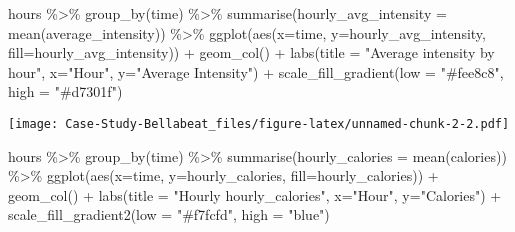 \documentclass[
]{article}
\newenvironment{Shaded}{\begin{snugshade}}{\end{snugshade}}
\newcommand{\AttributeTok}[1]{\textcolor[rgb]{0.77,0.63,0.00}{#1}}
\newcommand{\FunctionTok}[1]{\textcolor[rgb]{0.00,0.00,0.00}{#1}}
\newcommand{\NormalTok}[1]{#1}
\newcommand{\SpecialCharTok}[1]{\textcolor[rgb]{0.00,0.00,0.00}{#1}}
\newcommand{\StringTok}[1]{\textcolor[rgb]{0.31,0.60,0.02}{#1}}
\begin{document}
\begin{Shaded}
\begin{Highlighting}[]
\NormalTok{hours }\SpecialCharTok{\%\textgreater{}\%}
  \FunctionTok{group\_by}\NormalTok{(time) }\SpecialCharTok{\%\textgreater{}\%}
  \FunctionTok{summarise}\NormalTok{(}\AttributeTok{hourly\_avg\_intensity =} \FunctionTok{mean}\NormalTok{(average\_intensity))  }\SpecialCharTok{\%\textgreater{}\%}
  \FunctionTok{ggplot}\NormalTok{(}\FunctionTok{aes}\NormalTok{(}\AttributeTok{x=}\NormalTok{time, }\AttributeTok{y=}\NormalTok{hourly\_avg\_intensity, }\AttributeTok{fill=}\NormalTok{hourly\_avg\_intensity)) }\SpecialCharTok{+} 
  \FunctionTok{geom\_col}\NormalTok{() }\SpecialCharTok{+}
  \FunctionTok{labs}\NormalTok{(}\AttributeTok{title =} \StringTok{"Average intensity by hour"}\NormalTok{, }\AttributeTok{x=}\StringTok{"Hour"}\NormalTok{, }\AttributeTok{y=}\StringTok{"Average Intensity"}\NormalTok{) }\SpecialCharTok{+} 
  \FunctionTok{scale\_fill\_gradient}\NormalTok{(}\AttributeTok{low =} \StringTok{"\#fee8c8"}\NormalTok{, }\AttributeTok{high =} \StringTok{"\#d7301f"}\NormalTok{)}
\end{Highlighting}
\end{Shaded}

\texttt{[image: Case-Study-Bellabeat\_files/figure-latex/unnamed-chunk-2-2.pdf]}

\begin{Shaded}
\begin{Highlighting}[]
\NormalTok{hours }\SpecialCharTok{\%\textgreater{}\%}
  \FunctionTok{group\_by}\NormalTok{(time) }\SpecialCharTok{\%\textgreater{}\%}
  \FunctionTok{summarise}\NormalTok{(}\AttributeTok{hourly\_calories =} \FunctionTok{mean}\NormalTok{(calories)) }\SpecialCharTok{\%\textgreater{}\%}
  \FunctionTok{ggplot}\NormalTok{(}\FunctionTok{aes}\NormalTok{(}\AttributeTok{x=}\NormalTok{time, }\AttributeTok{y=}\NormalTok{hourly\_calories, }\AttributeTok{fill=}\NormalTok{hourly\_calories)) }\SpecialCharTok{+} 
  \FunctionTok{geom\_col}\NormalTok{() }\SpecialCharTok{+}
  \FunctionTok{labs}\NormalTok{(}\AttributeTok{title =} \StringTok{"Hourly hourly\_calories"}\NormalTok{, }\AttributeTok{x=}\StringTok{"Hour"}\NormalTok{, }\AttributeTok{y=}\StringTok{"Calories"}\NormalTok{) }\SpecialCharTok{+} 
  \FunctionTok{scale\_fill\_gradient2}\NormalTok{(}\AttributeTok{low =} \StringTok{"\#f7fcfd"}\NormalTok{, }\AttributeTok{high =} \StringTok{"blue"}\NormalTok{)}
\end{Highlighting}
\end{Shaded}
\end{document}

